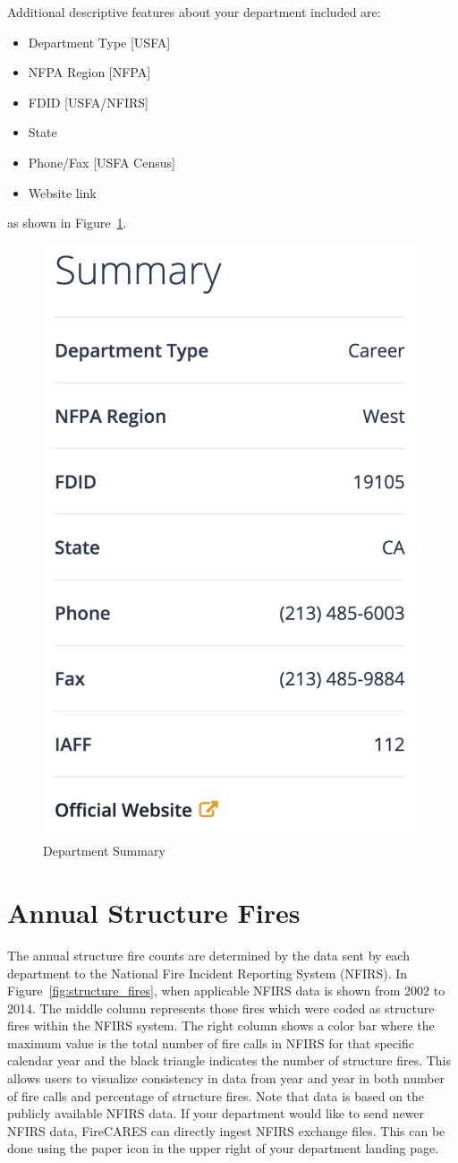\documentclass[12pt,oneside]{book}
\begin{document}
\FloatBarrier

Additional descriptive features about your department included are:

\begin{itemize}
\item Department Type [USFA]
\item NFPA Region [NFPA]
\item FDID [USFA/NFIRS]
\item State 
\item Phone/Fax [USFA Census]
\item Website link
\end{itemize}

as shown in Figure~\ref{fig:description2}.

\begin{figure}[ht!]
\centering
\includegraphics[width=.5\columnwidth]{Figures/description2}
\caption{Department Summary}
\label{fig:description2}
\end{figure}

\FloatBarrier

\section{Annual Structure Fires}

The annual structure fire counts are determined by the data sent by each department to the National Fire Incident Reporting System (NFIRS). In Figure~\ref{fig:structure_fires}, when applicable NFIRS data is shown from 2002 to 2014. The middle column represents those fires which were coded as structure fires within the NFIRS system. The right column shows a color bar where the maximum value is the total number of fire calls in NFIRS for that specific calendar year and the black triangle indicates the number of structure fires. This allows users to visualize consistency in data from year and year in both number of fire calls and percentage of structure fires. Note that data is based on the publicly available NFIRS data. If your department would like to send newer NFIRS data, FireCARES can directly ingest NFIRS exchange files. This can be done using the paper icon in the upper right of your department landing page. 
\end{document}
